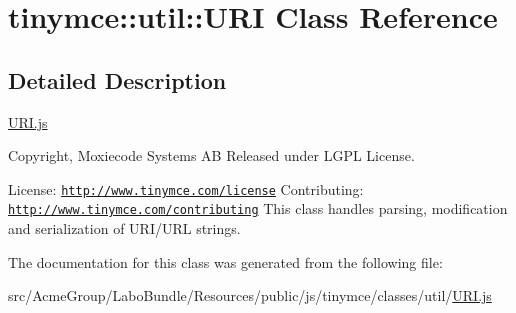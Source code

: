 \hypertarget{classtinymce_1_1util_1_1_u_r_i}{\section{tinymce\+:\+:util\+:\+:U\+R\+I Class Reference}
\label{classtinymce_1_1util_1_1_u_r_i}
}


\subsection{Detailed Description}
\hyperlink{_u_r_i_8js}{U\+R\+I.\+js}

Copyright, Moxiecode Systems A\+B Released under L\+G\+P\+L License.

License\+: \href{http://www.tinymce.com/license}{\tt http\+://www.\+tinymce.\+com/license} Contributing\+: \href{http://www.tinymce.com/contributing}{\tt http\+://www.\+tinymce.\+com/contributing} This class handles parsing, modification and serialization of U\+R\+I/\+U\+R\+L strings. 

The documentation for this class was generated from the following file\+:\begin{DoxyCompactItemize}
\item 
src/\+Acme\+Group/\+Labo\+Bundle/\+Resources/public/js/tinymce/classes/util/\hyperlink{_u_r_i_8js}{U\+R\+I.\+js}\end{DoxyCompactItemize}

